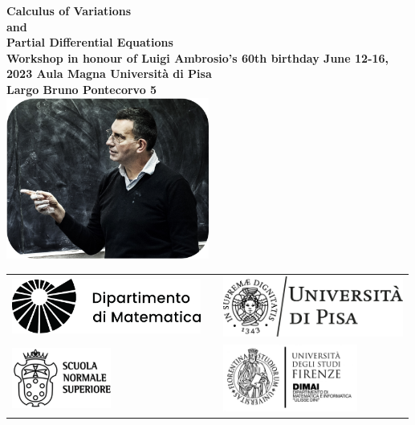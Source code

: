 \documentclass[a4paper, 12pt, oneside]{book}
\begin{document}
\pagestyle{empty}
\setpdftargetpages  %
\begin{center}
    \mbox{}
    \vfill
    \LARGE\bf
    {\color{blue}Calculus of Variations\\ and \\Partial Differential Equations}\\
    \vskip 0.5cm
    \large \textbf{\color{orange}Workshop in honour of Luigi Ambrosio's 60th birthday}
    \vskip 0.5cm
    \normalsize
    \textbf{\color{blue}June 12-16, 2023}
    \vskip 0.5cm
    \textbf{\color{blue}Aula Magna Università di Pisa}\\ 
    \textbf{\color{blue}Largo Bruno Pontecorvo 5}\\
    \vfill
    \includegraphics[width=0.5\textwidth]{ambrosio.png}

    \vfill

    \begin{tabular}{lcl}
    \includegraphics*[height=1.8cm]{matematica_dx_nero.pdf}
    & \hspace{2cm}&
    \includegraphics*[height=2cm]{marchio_unipi_orizz_black.png}
    \\
    \mbox{\hspace{3mm}}\includegraphics*[height=2cm]{Sns-Scuola-Normale-Superiore-Pisa-black.png}
    & &
    \includegraphics*[height=2.2cm]{logo_DIMAI_negativo-1-768x384.png}
    \end{tabular}
  \end{center}
    
\end{document}
